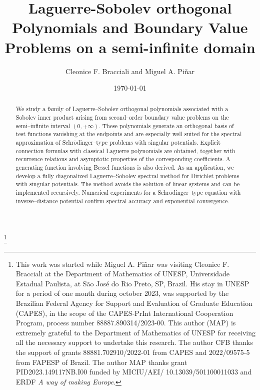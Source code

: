 \documentclass[reqno,10pt]{amsart}
\theoremstyle{plain}
\numberwithin{equation}{section}
\numberwithin{figure}{section}
\begin{document}
\title[Laguerre-Sobolev orthogonal Polynomials]{Laguerre-Sobolev orthogonal Polynomials and Boundary Value Problems on a semi-infinite domain}

\author[C. F. Bracciali and M. A.  Pi\~nar]
{Cleonice F. Bracciali and Miguel A. Pi\~nar}

\address[C. F. Bracciali]{Departamento de Matem\'{a}tica, IBILCE, UNESP - Universidade Estadual Paulista,
15054-000, S\~ao Jos\'e do Rio Preto, SP (Brazil)}

\address[M. A.  Pi\~nar]{Instituto de Matem\'aticas UGR -- IMAG \&
Departamento de Matem\'{a}tica Aplicada, Facultad de Ciencias. Universidad de Granada (Spain)}

\thanks{This work was started while Miguel A. Pi\~nar was visiting Cleonice F. Bracciali at the Department of Mathematics of UNESP, Universidade Estadual Paulista, at S\~ao Jos\'e do Rio Preto, SP, Brazil. His stay in UNESP for a period of one month during october 2023, was supported by the Brazilian Federal Agency for Support and Evaluation of Graduate Education (CAPES), in the scope of the CAPES-PrInt International Cooperation Program, process number 88887.890314/2023-00. This author (MAP) is extremely grateful to the Department of Mathematics of UNESP for receiving all the necessary support to undertake this research.
The author CFB thanks the support of grants 88881.702910/2022-01 from CAPES and 2022/09575-5 from FAPESP of Brazil. The author MAP thanks grant PID2023.149117NB.I00 funded by MICIU/AEI/ 10.13039/501100011033 and ERDF \textit{A way of making Europe}.}

\date{\today}


\begin{abstract}
We study a family of Laguerre--Sobolev orthogonal polynomials associated with a Sobolev inner product arising from second--order boundary value problems on the semi--infinite interval $(0,+\infty)$. These polynomials generate an orthogonal basis of test functions vanishing at the endpoints and are especially well suited for the spectral approximation of Schr\"odinger--type problems with singular potentials. Explicit connection formulas with classical Laguerre polynomials are obtained, together with recurrence relations and asymptotic properties of the corresponding coefficients. A generating function involving Bessel functions is also derived. As an application, we develop a fully diagonalized Laguerre--Sobolev spectral method for Dirichlet problems with singular potentials. The method avoids the solution of linear systems and can be implemented recursively. Numerical experiments for a Schr\"odinger--type equation with inverse--distance potential confirm spectral accuracy and exponential convergence.
\end{abstract}
\end{document}
